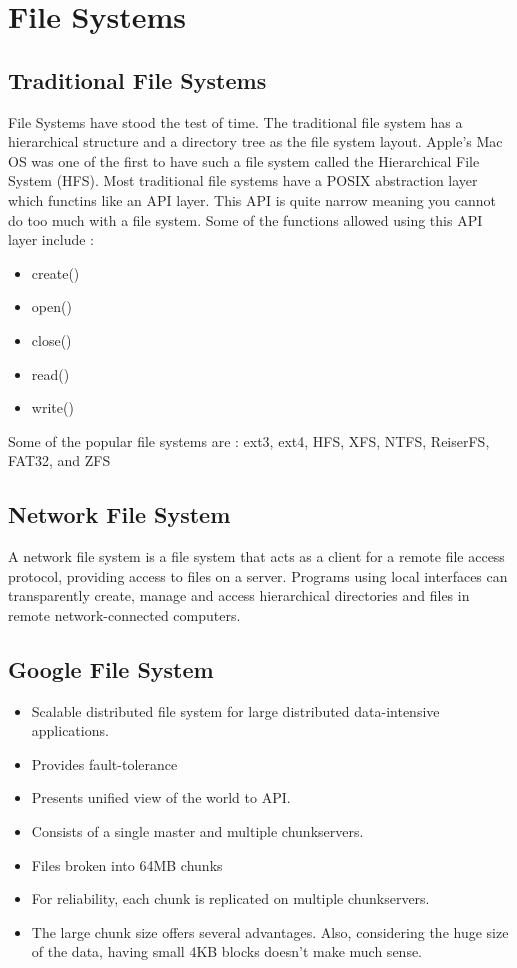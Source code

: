\documentclass[twoside]{article}
\begin{document}
	\section{File Systems}
	\subsection{Traditional File Systems}
	File Systems have stood the test of time. The traditional file system has a hierarchical structure and a directory tree as the file system layout.
	Apple's Mac OS was one of the first to have such a file system called the Hierarchical File System (HFS). Most traditional file systems have a POSIX abstraction layer which functins like an API layer. This API is quite narrow meaning you cannot do too much with a file system. Some of the functions allowed using this API layer include :
	\begin{itemize}
		\item create()
		\item open()
		\item close()
		\item read()
		\item write()
	\end{itemize}
	Some of the popular file systems are : ext3, ext4, HFS, XFS, NTFS, ReiserFS, FAT32, and ZFS
	\subsection{Network File System}
	A network file system is a file system that acts as a client for a remote file access protocol, providing access to files on a server. Programs using local interfaces can transparently create, manage and access hierarchical directories and files in remote network-connected computers.
	\subsection{Google File System}
	\begin{itemize}
		\item Scalable distributed file system for large distributed data-intensive applications.
		\item Provides fault-tolerance
		\item Presents unified view of the world to API.
		\item Consists of a single master and multiple chunkservers.
		\item Files broken into 64MB chunks
		\item For reliability, each chunk is replicated on multiple chunkservers.
		\item The large chunk size offers several advantages. Also, considering the huge size of the data, having small 4KB blocks doesn't make much sense. 
	\end{itemize}
	
\end{document}
